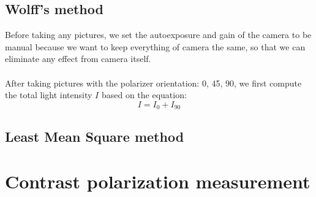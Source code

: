 \documentclass[english]{article}
\begin{document}
\subsection{Wolff's method}
Before taking any pictures, we set the autoexposure and gain of the camera to be manual because we want to keep everything of camera the same, so that we can eliminate any effect from camera itself.\\
\\
After taking pictures with the polarizer orientation: 0\textdegree, 45\textdegree, 90\textdegree, we first compute the total light intensity $I$ based on the equation:
$$
I = I_{0} + I_{90}
$$

\subsection{Least Mean Square method}

\section{Contrast polarization measurement}
\end{document}
